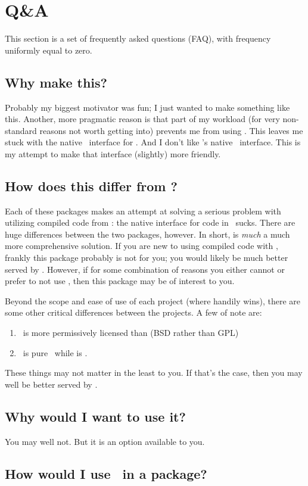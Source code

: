 \section{Q\&A}

This section is a set of frequently asked questions (FAQ), with frequency uniformly
equal to zero.


\subsection{Why make this?}

Probably my biggest motivator was fun; I just wanted to make something like this.  Another,
more pragmatic reason is that part of my workload (for very non-standard reasons not worth 
getting into) prevents me from using .  This leaves me stuck with the native \C\ 
interface for \R.  And I don't like \R's native \C\ interface.  This is my attempt to 
make that interface (slightly) more friendly.


\subsection{How does this differ from ?}
Each of these packages makes an attempt at solving a serious problem with utilizing compiled
code from \R: the native interface for \proglang{C} code in \R\ sucks.  There are huge 
differences between the two packages, however. In short, \pkg{Rcpp} is \emph{much} a much 
more comprehensive solution.  If you are new to using compiled code with \R, frankly this 
package probably is not for you; you would likely be much better served by .  
However, if for some combination of reasons you either cannot or prefer to not use 
\pkg{Rcpp}, then this package may be of interest to you.

Beyond the scope and ease of use of each project (where  handily wins), there are
some other critical differences between the projects.  A few of note are:

\begin{enumerate}
  \item \thispackage\ is more permissively licensed than  (BSD rather than GPL)
  \item \thispackage\ is pure \C\, while \pkg{Rcpp} is \Cpp.
\end{enumerate}

These things may not matter in the least to you.  If that's the case, then you
may well be better served by \pkg{Rcpp}.



\subsection{Why would I want to use it?}

You may well not.  But it is an option available to you.


\subsection{How would I use \thispackage\ in a package?}

